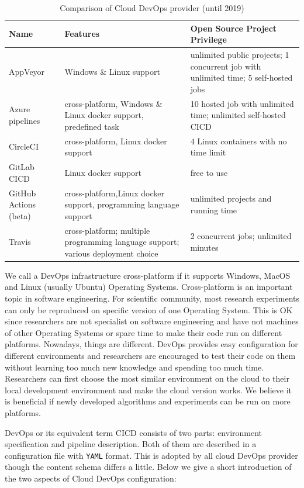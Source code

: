 \documentclass{IEEEcsmag}
\begin{document}
\begin{table}
\caption{Comparison of Cloud DevOps provider (until 2019)}
\label{table}
\small
\begin{tabular*}{17.5pc}{@{}|p{39pt}|p{73pt}<{\raggedright}|p{60pt}<{\raggedright}|@{}}
\hline
Name& 
Features& 
Open Source Project Privilege\\
\hline
AppVeyor& Windows \& Linux support & unlimited public projects; 1 concurrent job with unlimited time; 5 self-hosted jobs
 \\
 \hline
 Azure pipelines & cross-platform, Windows \& Linux docker support, predefined task & 10 hosted job with unlimited time; unlimited self-hosted CICD
 \\
 \hline
   CircleCI & cross-platform, Linux docker support & 4 Linux containers with no time limit  \\
 \hline
GitLab CICD& Linux docker support & free to use

\\
\hline
GitHub Actions (beta) & cross-platform,Linux docker support, programming language support
& unlimited projects and running time
\\
\hline
Travis& 
cross-platform; multiple programming language support; various deployment choice
& 2 concurrent jobs; unlimited minutes
\\
\hline
\end{tabular*}
\label{tab1}
\end{table}

We call a DevOps infrastructure cross-platform if it supports Windows, MacOS and Linux (usually Ubuntu) Operating Systems.
Cross-platform is an important topic in software engineering. For scientific community, most research experiments can only be reproduced on specific version of one Operating System. This is OK since researchers are not specialist on software engineering and have not machines of other Operating Systems or spare time to make their code run on different platforms. Nowadays, things are different. DevOps provides easy configuration for different environments and researchers are encouraged to test their code on them without learning too much new knowledge and spending too much time. Researchers can first choose the most similar environment on the cloud to their local development environment and make the cloud version works. We believe it is beneficial if newly developed algorithms and experiments can be run on more platforms. 

DevOps or its equivalent term CICD consists of two parts: environment specification and pipeline description. 
Both of them are described in a configuration file with \texttt{YAML} format. This is adopted by all cloud DevOps provider though the content schema differs a little. Below we give a short introduction of the two aspects of Cloud DevOps configuration:
\end{document}
